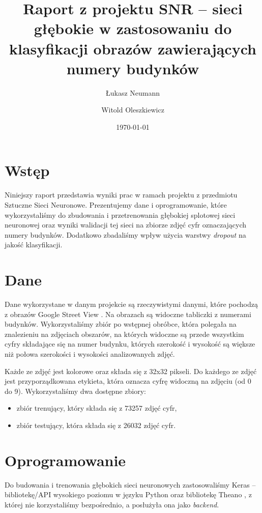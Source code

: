 \documentclass[12pt]{article}
\title{Raport z projektu SNR -- sieci głębokie w zastosowaniu do klasyfikacji obrazów zawierających numery budynków}
\author{
        Łukasz Neumann \\
            \and
        Witold Oleszkiewicz \\
}
\date{\today}
\begin{document}
\maketitle


\section{Wstęp}

Niniejszy raport przedstawia wyniki prac w ramach projektu z przedmiotu Sztuczne Sieci Neuronowe. Prezentujemy dane i oprogramowanie, które wykorzystaliśmy do zbudowania i przetrenowania głębokiej splotowej sieci neuronowej oraz wyniki walidacji tej sieci na zbiorze zdjęć cyfr oznaczających numery budynków. Dodatkowo zbadaliśmy wpływ użycia warstwy \textit{dropout} na jakość klasyfikacji.

\section{Dane}

Dane wykorzystane w danym projekcie są rzeczywistymi danymi, które pochodzą z obrazów Google Street View \cite{dane}. Na obrazach są widoczne tabliczki z numerami budynków. Wykorzystaliśmy zbiór po wstępnej obróbce, która polegała na znalezieniu na zdjęciach obszarów, na których widoczne są przede wszystkim cyfry składające się na numer budynku, których szerokość i wysokość są większe niż połowa szerokości i wysokości analizowanych zdjęć.

Każde ze zdjęć jest kolorowe oraz składa się z 32x32 pikseli. Do każdego ze zdjęć jest przyporządkowana etykieta, która oznacza cyfrę widoczną na zdjęciu (od 0 do 9). Wykorzystaliśmy dwa dostępne zbiory:

\begin{itemize}
\item zbiór trenujący, który składa się z 73257 zdjęć cyfr,
\item zbiór testujący, która składa się z 26032 zdjęć cyfr.
\end{itemize}

\section{Oprogramowanie}

Do budowania i trenowania głębokich sieci neuronowych zastosowaliśmy Keras \cite{keras} -- bibliotekę/API wysokiego poziomu w języku Python oraz bibliotekę Theano \cite{theano}, z której nie korzystaliśmy bezpośrednio, a posłużyła ona jako \textit{backend}. 
\end{document}
